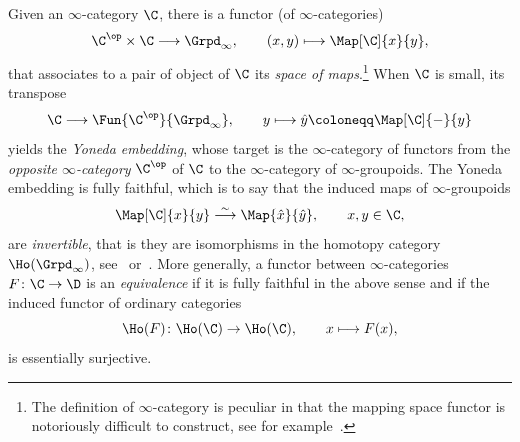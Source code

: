 \documentclass[a4paper]{amsart}
\begin{document}
Given an $\infty$-category $\C$, there is a functor (of $\infty$-categories)
\[
  \C^\op\times\C\longrightarrow\Grpd_\infty,\qquad
  (x,y)\longmapsto\Map[\C]{x}{y},
\]
that associates to a pair of object of $\C$ its \emph{space of
  maps}.\footnote{The definition of $\infty$-category is peculiar in that the
  mapping space functor is notoriously difficult to construct, see for
  example~\cite[Section~5.8]{Cis19}.} When $\C$ is small, its transpose
\[
  \C\longrightarrow\Fun{\C^\op}{\Grpd_\infty},\qquad
  y\longmapsto\hat{y}\coloneqq\Map[\C]{-}{y}
\]
yields the \emph{Yoneda embedding}, whose target is the $\infty$-category of
functors from the \emph{opposite $\infty$-category} $\C^\op$ of $\C$ to the
$\infty$-category of $\infty$-groupoids. The Yoneda embedding is fully faithful,
which is to say that the induced maps of $\infty$-groupoids
\[
  \Map[\C]{x}{y}\stackrel{\sim}{\longrightarrow}\Map{\hat{x}}{\hat{y}},\qquad
  x,y\in\C,
\]
are \emph{invertible}, that is they are isomorphisms in the homotopy category
$\Ho(\Grpd_\infty)$, see~\cite[Proposition~5.1.3.1]{Lur09}
or~\cite[Theorem~5.8.13]{Cis19}. More generally, a functor between
$\infty$-categories $F\colon\C\to\D$ is an \emph{equivalence} if it is fully
faithful in the above sense and if the induced functor of ordinary categories
\[
  \Ho(F)\colon\Ho(\C)\to\Ho(\C),\qquad x\longmapsto F(x),
\]
is essentially surjective.
\end{document}
